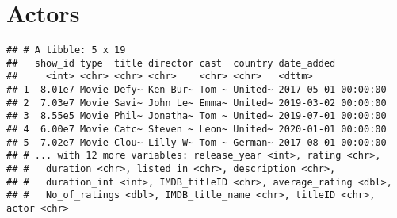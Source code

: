 \documentclass[]{article}
\newenvironment{Shaded}{\begin{snugshade}}{\end{snugshade}}
\newcommand{\DataTypeTok}[1]{\textcolor[rgb]{0.13,0.29,0.53}{#1}}
\newcommand{\DecValTok}[1]{\textcolor[rgb]{0.00,0.00,0.81}{#1}}
\newcommand{\KeywordTok}[1]{\textcolor[rgb]{0.13,0.29,0.53}{\textbf{#1}}}
\newcommand{\NormalTok}[1]{#1}
\newcommand{\OperatorTok}[1]{\textcolor[rgb]{0.81,0.36,0.00}{\textbf{#1}}}
\newcommand{\StringTok}[1]{\textcolor[rgb]{0.31,0.60,0.02}{#1}}
\begin{document}
\hypertarget{actors}{%
\section{Actors}\label{actors}}

\begin{Shaded}
\end{Shaded}

\begin{verbatim}
## # A tibble: 5 x 19
##   show_id type  title director cast  country date_added         
##     <int> <chr> <chr> <chr>    <chr> <chr>   <dttm>             
## 1  8.01e7 Movie Defy~ Ken Bur~ Tom ~ United~ 2017-05-01 00:00:00
## 2  7.03e7 Movie Savi~ John Le~ Emma~ United~ 2019-03-02 00:00:00
## 3  8.55e5 Movie Phil~ Jonatha~ Tom ~ United~ 2019-07-01 00:00:00
## 4  6.00e7 Movie Catc~ Steven ~ Leon~ United~ 2020-01-01 00:00:00
## 5  7.02e7 Movie Clou~ Lilly W~ Tom ~ German~ 2017-08-01 00:00:00
## # ... with 12 more variables: release_year <int>, rating <chr>,
## #   duration <chr>, listed_in <chr>, description <chr>,
## #   duration_int <int>, IMDB_titleID <chr>, average_rating <dbl>,
## #   No_of_ratings <dbl>, IMDB_title_name <chr>, titleID <chr>, actor <chr>
\end{verbatim}

\begin{Shaded}
\end{Shaded}
\end{document}
